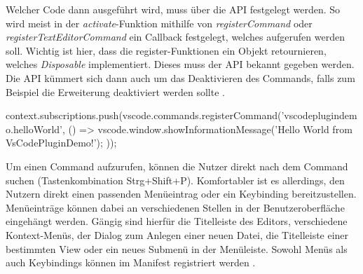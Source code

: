   Welcher Code dann ausgeführt wird, muss über die API festgelegt werden. So wird meist
  in der \emph{activate}-Funktion mithilfe von \emph{registerCommand} oder \emph{registerTextEditorCommand}
  ein Callback festgelegt, welches aufgerufen werden soll. Wichtig ist hier, dass
  die register-Funktionen ein Objekt retournieren, welches \emph{Disposable} implementiert.
  Dieses muss der API bekannt gegeben werden. 
  Die API kümmert sich dann auch um das Deaktivieren des Commands, falls zum Beispiel
  die Erweiterung deaktiviert werden sollte \cite{VSCodeExtensionAPICommands}.
\begin{JsCode}
    context.subscriptions.push(vscode.commands.registerCommand('vscodeplugindemo.helloWorld', () => {
      vscode.window.showInformationMessage('Hello World from VsCodePluginDemo!');
    })); 
\end{JsCode}

  Um einen Command aufzurufen, können die Nutzer direkt nach dem Command suchen (Tastenkombination Strg+Shift+P).
  Komfortabler ist es allerdings, den Nutzern direkt einen passenden Menüeintrag oder ein Keybinding
  bereitzustellen. Menüeinträge können dabei an verschiedenen Stellen in der
  Benutzeroberfläche eingehängt werden.
  Gängig sind hierfür die Titelleiste des Editors, verschiedene Kontext-Menüs, der Dialog
  zum Anlegen einer neuen Datei, die Titelleiste einer bestimmten View oder ein neues Submenü in der Menüleiste.
  Sowohl Menüs als auch Keybindings können im Manifest registriert werden
  \cite{VSCodeExtensionAPIContributionPointsMenus}.
